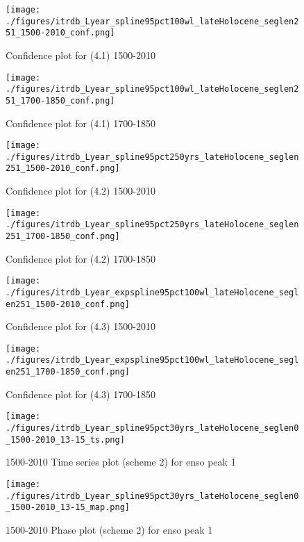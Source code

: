 \documentclass[smallextended]{svjour3}       %
\begin{document}
\begin{figure}[!tbp]
\centering
\begin{minipage}[b]{0.45\textwidth}
\texttt{[image: ./figures/itrdb\_Lyear\_spline95pct100wl\_lateHolocene\_seglen251\_1500-2010\_conf.png]}
\caption{Confidence plot for (4.1) 1500-2010}
\end{minipage}
\hfill
\label{conf_4.1_1500}
\begin{minipage}[b]{0.45\textwidth}
\texttt{[image: ./figures/itrdb\_Lyear\_spline95pct100wl\_lateHolocene\_seglen251\_1700-1850\_conf.png]}
\caption{Confidence plot for (4.1) 1700-1850}
\label{conf_4.1_1700}
\end{minipage}
\end{figure}

\begin{figure}[!tbp]
\centering
\begin{minipage}[b]{0.45\textwidth}
\texttt{[image: ./figures/itrdb\_Lyear\_spline95pct250yrs\_lateHolocene\_seglen251\_1500-2010\_conf.png]}
\caption{Confidence plot for (4.2) 1500-2010}
\label{conf_4.2_1500}
\end{minipage}
\hfill
\begin{minipage}[b]{0.45\textwidth}
\texttt{[image: ./figures/itrdb\_Lyear\_spline95pct250yrs\_lateHolocene\_seglen251\_1700-1850\_conf.png]}
\caption{Confidence plot for (4.2) 1700-1850}
\label{conf_4.2_1700}
\end{minipage}
\end{figure}

\begin{figure}[!tbp]
\centering
\begin{minipage}[b]{0.45\textwidth}
\texttt{[image: ./figures/itrdb\_Lyear\_expspline95pct100wl\_lateHolocene\_seglen251\_1500-2010\_conf.png]}
\caption{Confidence plot for (4.3) 1500-2010}
\label{conf_4.3_1500}
\end{minipage}
\hfill
\begin{minipage}[b]{0.45\textwidth}
\texttt{[image: ./figures/itrdb\_Lyear\_expspline95pct100wl\_lateHolocene\_seglen251\_1700-1850\_conf.png]}
\caption{Confidence plot for (4.3) 1700-1850}
\label{conf_4.3_1700}
\end{minipage}
\end{figure}

\clearpage
\newpage

\begin{figure}[!tbp]
\centering
\begin{minipage}[b]{0.45\textwidth}
\texttt{[image: ./figures/itrdb\_Lyear\_spline95pct30yrs\_lateHolocene\_seglen0\_1500-2010\_13-15\_ts.png]}
\caption{1500-2010 Time series plot (scheme 2) for enso peak 1}
\label{ts_1}
\end{minipage}
\hfill
\begin{minipage}[b]{0.45\textwidth}
\texttt{[image: ./figures/itrdb\_Lyear\_spline95pct30yrs\_lateHolocene\_seglen0\_1500-2010\_13-15\_map.png]}
\caption{1500-2010 Phase plot (scheme 2) for enso peak 1}
\label{map_1}
\end{minipage}
\end{figure}
\end{document}
